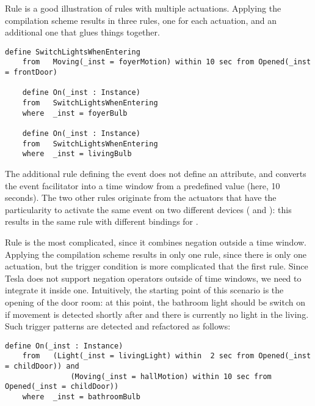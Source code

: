 Rule  is a good illustration of \IOTDSL rules with multiple actuations. Applying the compilation scheme results in three rules, one for each actuation, and an additional one that glues things together. 
\begin{lstlisting}[language=tesla, numbers=none]
	define SwitchLightsWhenEntering
	from   Moving(_inst = foyerMotion) within 10 sec from Opened(_inst = frontDoor)

	define On(_inst : Instance)
	from   SwitchLightsWhenEntering
	where  _inst = foyerBulb
	
	define On(_inst : Instance)
	from   SwitchLightsWhenEntering
	where  _inst = livingBulb
\end{lstlisting}
The additional rule defining the  event does not define an  attribute, and converts the event facilitator  into a time window from a predefined value (here, 10 seconds). The two other rules originate from the actuators that have the particularity to activate the same event on two different devices ( and ): this results in the same rule with different bindings for .

Rule  is the most complicated, since it combines negation outside a time window. Applying the compilation scheme results in only one rule, since there is only one actuation, but the trigger condition is more complicated that the first rule. Since Tesla does not support negation operators outside of time windows, we need to integrate it inside one. Intuitively, the starting point of this scenario is the opening of the door room: at this point, the bathroom light should be switch on if movement is detected shortly after and there is currently no light in the living. Such trigger patterns are detected and refactored as follows: 
\begin{lstlisting}[language=tesla, numbers=none]
	define On(_inst : Instance)
	from   (Light(_inst = livingLight) within  2 sec from Opened(_inst = childDoor)) and 
			   (Moving(_inst = hallMotion) within 10 sec from Opened(_inst = childDoor))
	where  _inst = bathroomBulb
\end{lstlisting}
